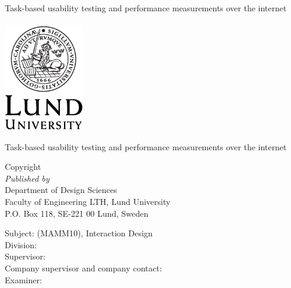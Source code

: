 \documentclass[a4paper,11pt]{article}
\newcommand\HOne{\fontsize{20}{12}\selectfont}
\begin{document}
%


\newpage

\begin{center}
  {\HOne Task-based usability testing and performance measurements over the internet} \\
  \vspace{2.5cm}
  {\Large \name} \\
  \vspace{2.0cm}
  \includegraphics[width=3.5cm]{LU-logotyp-tryck-digitalt/EPS_for_tryck/Engelska/LundUniversity_C2line_BLACK.eps}

\end{center}

\newpage

{\Large Task-based usability testing and performance measurements over the
internet}
\vspace{1.5cm} \\
\begin{large}
  Copyright \textcopyright \ \the\year \ \name \\

  \textit{Published by} \vspace{0.2cm} \\
      Department of Design Sciences \\
      Faculty of Engineering LTH, Lund University \\
      P.O. Box 118, SE-221 00 Lund, Sweden

  \vspace{0.8cm}
  Subject: (MAMM10), Interaction Design \\
  Division: \division \\
  Supervisor: \supervisor \\
  Company supervisor and company contact: \contact \\
  Examiner: \examiner \\


\end{large}
\end{document}

